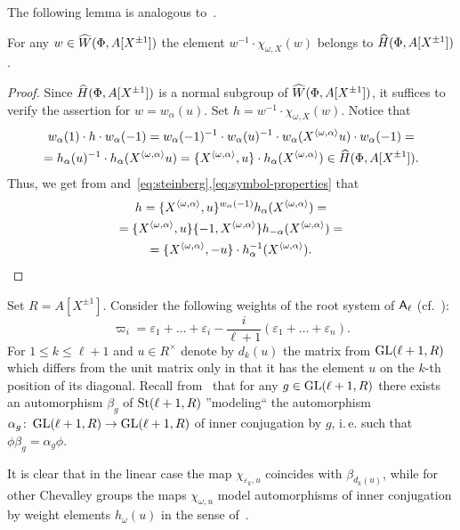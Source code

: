 The following lemma is analogous to~\cite[Lemma~3.1(c)]{Tu83}.
\begin{lemma} \label{lem:winv-chiw}
For any $w \in \widehat{W}(\Phi, A[X^{\pm 1}])$ the element $w^{-1} \cdot \chi_{\omega, X}(w)$ belongs to $\widehat{H}(\Phi, A[X^{\pm 1}])$.
\end{lemma}
\begin{proof}
    Since $\widehat{H}(\Phi, A[X^{\pm 1}])$ is a normal subgroup of $\widehat{W}(\Phi, A[X^{\pm 1}])$, it suffices to verify the assertion for $w = w_\alpha(u)$.
    Set $h = w^{-1} \cdot \chi_{\omega, X}(w)$.
    Notice that
    \begin{multline*} w_\alpha(1) \cdot h\cdot  w_\alpha(-1) = w_\alpha(-1)^{-1} \cdot w_\alpha(u)^{-1} \cdot w_{\alpha}(X^{\langle \omega, \alpha \rangle} u) \cdot w_\alpha(-1) = \\
    = h_\alpha(u)^{-1} \cdot h_\alpha(X^{ \langle \omega, \alpha \rangle }u) = \{ X^{\langle \omega, \alpha \rangle}, u \} \cdot h_\alpha(X^{\langle \omega, \alpha \rangle}) \in \widehat{H}(\Phi, A[X^{\pm 1}]).\end{multline*}
    Thus, we get from\cite[Lemme~5.2]{Ma69} and~\eqref{eq:steinberg},\eqref{eq:symbol-properties} that
     \begin{multline} \label{eq:w-computation} h = \{ X^{\langle \omega, \alpha \rangle}, u \}{}^{w_\alpha(-1)}h_\alpha(X^{\langle \omega, \alpha \rangle}) = \\
      = \{ X^{\langle \omega, \alpha \rangle}, u \} \{ -1, X^{\langle \omega, \alpha \rangle} \} h_{-\alpha}(X^{\langle \omega, \alpha \rangle}) = \\
      = \{ X^{\langle \omega, \alpha \rangle}, -u \} \cdot h_\alpha^{-1}(X^{\langle \omega, \alpha \rangle}).\qedhere\end{multline}
\end{proof}

\begin{example} \label{exm:chi-linear}
Set $R = A[X^{\pm 1}]$.
Consider the following weights of the root system of $\mathsf{A}_\ell$ (cf.~\cite[\S~VI.4.7]{Bou}):
\[ \varpi_{i} = \varepsilon_1 + \ldots + \varepsilon_i - \frac{i}{\ell+1}(\varepsilon_1 + \ldots + \varepsilon_n). \]
For $1\leq k\leq \ell+1$ and $u \in R^\times$ denote by $d_k(u)$ the matrix from $\operatorname{GL}(\ell+1, R)$ which differs from the unit matrix only in that it has the element $u$ on the $k$-th position of its diagonal.
Recall from~\cite[Corollary~4]{Ka77} that for any $g \in \operatorname{GL}(\ell+1, R)$ there exists an automorphism $\beta_g$ of $\operatorname{St}(\ell+1, R)$ ''modeling`` the automorphism $\alpha_g \colon \operatorname{GL}(\ell+1, R) \to \operatorname{GL}(\ell+1, R)$ of inner conjugation by $g$, i.\,e. such that $\phi \beta_g = \alpha_g \phi$.


It is clear that in the linear case the map $\chi_{\varepsilon_k, u}$ coincides with $\beta_{d_k(u)}$,
while for other Chevalley groups the maps $\chi_{\omega, u}$ model automorphisms of inner conjugation by weight elements $h_\omega(u)$ in the sense of~\cite[\S~4]{Vav09}.
\end{example}


